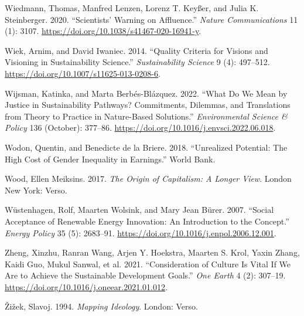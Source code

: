 \documentclass[
  a4paper,
  openany]{book}
\newlength{\cslhangindent}
\newenvironment{CSLReferences}[2] %
 {\begin{list}{}{%
  \setlength{\itemindent}{0pt}
  \setlength{\leftmargin}{0pt}
  \setlength{\parsep}{0pt}
  \ifodd #1
   \setlength{\leftmargin}{\cslhangindent}
   \setlength{\itemindent}{-1\cslhangindent}
  \fi
  \setlength{\itemsep}{#2\baselineskip}}}
 {\end{list}}
\begin{document}
\begin{CSLReferences}{1}{0}
Wiedmann, Thomas, Manfred Lenzen, Lorenz T. Keyßer, and Julia K.
Steinberger. 2020. {``Scientists' Warning on Affluence.''} \emph{Nature
Communications} 11 (1): 3107.
\url{https://doi.org/10.1038/s41467-020-16941-y}.

Wiek, Arnim, and David Iwaniec. 2014. {``Quality Criteria for Visions
and Visioning in Sustainability Science.''} \emph{Sustainability
Science} 9 (4): 497--512.
\url{https://doi.org/10.1007/s11625-013-0208-6}.

Wijsman, Katinka, and Marta Berbés-Blázquez. 2022. {``What Do We Mean by
Justice in Sustainability Pathways? {Commitments}, Dilemmas, and
Translations from Theory to Practice in Nature-Based Solutions.''}
\emph{Environmental Science \& Policy} 136 (October): 377--86.
\url{https://doi.org/10.1016/j.envsci.2022.06.018}.

Wodon, Quentin, and Benedicte de la Briere. 2018. {``Unrealized
Potential: {The} High Cost of Gender Inequality in Earnings.''} World
Bank.

Wood, Ellen Meiksins. 2017. \emph{The Origin of Capitalism: A Longer
View}. London New York: Verso.

Wüstenhagen, Rolf, Maarten Wolsink, and Mary Jean Bürer. 2007. {``Social
Acceptance of Renewable Energy Innovation: {An} Introduction to the
Concept.''} \emph{Energy Policy} 35 (5): 2683--91.
\url{https://doi.org/10.1016/j.enpol.2006.12.001}.

Zheng, Xinzhu, Ranran Wang, Arjen Y. Hoekstra, Maarten S. Krol, Yaxin
Zhang, Kaidi Guo, Mukul Sanwal, et al. 2021. {``Consideration of Culture
Is Vital If We Are to Achieve the {Sustainable Development Goals}.''}
\emph{One Earth} 4 (2): 307--19.
\url{https://doi.org/10.1016/j.oneear.2021.01.012}.

Žižek, Slavoj. 1994. \emph{Mapping {Ideology}}. London: Verso.

\end{CSLReferences}


\backmatter
\end{document}
